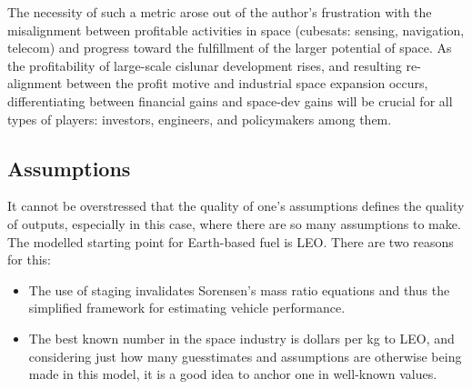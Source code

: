 \documentclass{article}
\begin{document}
The necessity of such a metric arose out of the author's frustration with the misalignment between profitable activities in space (cubesats: sensing, navigation, telecom) and progress toward the fulfillment of the larger potential of space. As the profitability of large-scale cislunar development rises, and resulting re-alignment between the profit motive and industrial space expansion occurs, differentiating between financial gains and space-dev gains will be crucial for all types of players: investors, engineers, and policymakers among them.

\subsection{Assumptions}
It cannot be overstressed that the quality of one's assumptions defines the quality of outputs, especially in this case, where there are so many assumptions to make. The modelled starting point for Earth-based fuel is LEO. There are two reasons for this:
\begin{itemize}
    \item The use of staging invalidates Sorensen's mass ratio equations and thus the simplified framework for estimating vehicle performance.
    \item The best known number in the space industry is dollars per kg to LEO, and considering just how many guesstimates and assumptions are otherwise being made in this model, it is a good idea to anchor one in well-known values.
\end{itemize}
\end{document}
